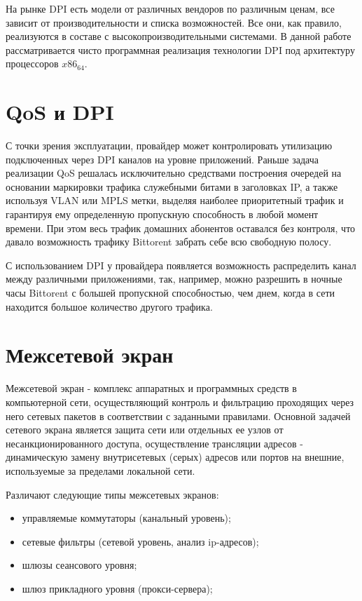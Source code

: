 На рынке DPI есть модели от различных вендоров по различным ценам, все зависит от производительности и списка возможностей. Все они, как правило, реализуются в составе с высокопроизводительными системами. В данной работе рассматривается чисто программная реализация технологии DPI под архитектуру процессоров $x86_64$.


\section{QoS и DPI}
С точки зрения эксплуатации, провайдер может контролировать утилизацию подключенных через DPI каналов на уровне приложений. Раньше задача реализации QoS решалась исключительно средствами построения очередей на основании маркировки трафика служебными битами в заголовках IP, а также используя VLAN или MPLS метки, выделяя наиболее приоритетный трафик и гарантируя ему определенную пропускную способность в любой момент времени. При этом весь трафик домашних абонентов оставался без контроля, что давало возможность трафику Bittorent забрать себе всю свободную полосу.

С использованием DPI у провайдера появляется возможность распределить канал между различными приложениями, так, например, можно разрешить в ночные часы Bittorent с большей пропускной способностью, чем днем, когда в сети находится большое количество другого трафика.


\section{Межсетевой экран}
Межсетевой экран - комплекс аппаратных и программных средств в компьютерной сети, осуществляющий контроль и фильтрацию проходящих через него сетевых пакетов в соответствии с заданными правилами. Основной задачей сетевого экрана является защита сети или отдельных ее узлов от несанкционированного доступа, осуществление трансляции адресов - динамическую замену внутрисетевых (серых) адресов или портов на внешние, используемые за пределами локальной сети.

Различают следующие типы межсетевых экранов:
\begin{itemize}
\item управляемые коммутаторы (канальный уровень);
\item сетевые фильтры (сетевой уровень, анализ ip-адресов);
\item шлюзы сеансового уровня;
\item шлюз прикладного уровня (прокси-сервера);
\end{itemize}

